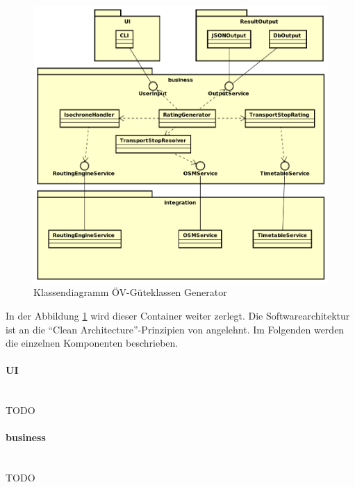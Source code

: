 \begin{figure}[ht]
    \centering
    \includegraphics[width=0.9\linewidth]{projectdoc/img/guetklassen_generator_architektur.png}
    \caption[Klassendiagramm ÖV-Güteklassen Generator]{Klassendiagramm ÖV-Güteklassen Generator}
    \label{fig:class_diagram_generator}
\end{figure}

In der Abbildung \ref{fig:class_diagram_generator} wird dieser Container weiter zerlegt.
Die Softwarearchitektur ist an die "`Clean Architecture"'-Prinzipien von \cite{martin_clean_architecture} angelehnt.
Im Folgenden werden die einzelnen Komponenten beschrieben.


\paragraph{UI}~\\
TODO

\paragraph{business}~\\
TODO


